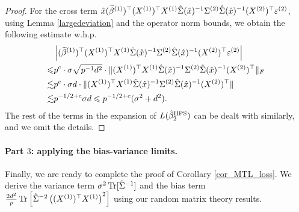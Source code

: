 \begin{proof}
For the cross term $\hat x (\widetilde \beta^{(1)})^\top (X^{(1)})^\top X^{(1)} \hat \Sigma(\hat x)^{-1}  \Sigma^{(2)} \hat \Sigma(\hat x)^{-1}  (X^{(2)})^\top  \varepsilon^{(2)}$, using Lemma \ref{largedeviation} and the operator norm bounds, we obtain the following estimate w.h.p.
\begin{align*}
& \left| (\widetilde \beta^{(1)})^\top (X^{(1)})^\top X^{(1)} \hat \Sigma(\hat x)^{-1}  \Sigma^{(2)} \hat \Sigma(\hat x)^{-1}  (X^{(2)})^\top  \varepsilon^{(2)}\right|  \\
  \leqslant & p^c \cdot \sigma\sqrt{p^{-1}d^2} \cdot \|(X^{(1)})^\top X^{(1)} \hat \Sigma(\hat x)^{-1}  \Sigma^{(2)} \hat \Sigma(\hat x)^{-1}  (X^{(2)})^\top  \|_F \\
 \lesssim & p^{c}\cdot \sigma d \cdot  \|(X^{(1)})^\top X^{(1)} \hat \Sigma(\hat x)^{-1}  \Sigma^{(2)} \hat \Sigma(\hat x)^{-1}  (X^{(2)})^\top  \| \\
 \lesssim & p^{-1/2+c}\sigma d\leqslant p^{-1/2+c}(\sigma^2+ d^2).
\end{align*}
The rest of the terms in the expansion of $L(\hat{\beta}_2^{\textup{HPS}})$ can be dealt with similarly, and we omit the details.
 \end{proof}
  
\paragraph{Part $3$: applying the bias-variance limits.}
Finally, we are ready to complete the proof of Corollary \ref{cor_MTL_loss}.
We derive the variance term $\sigma^2  \operatorname{Tr}[\hat\Sigma^{-1}]$ and the bias term $\frac{2d^2}{p} \operatorname{Tr}\left[\hat\Sigma^{-2} \left((X^{(1)})^\top X^{(1)} \right)^2\right]$ using our random matrix theory results.

